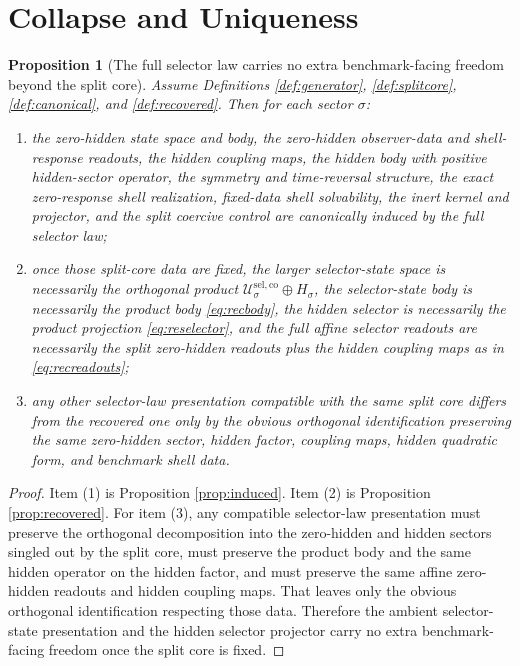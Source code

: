 \documentclass[11pt]{article}
\newcommand{\GapSpace}[1]{H_{#1}}
\newcommand{\SelCoreSpace}[1]{\mathcal U_{#1}^{\mathrm{sel,co}}}
\newtheorem{proposition}{Proposition}
\begin{document}
\section{Collapse and Uniqueness}

\begin{proposition}[The full selector law carries no extra benchmark-facing freedom beyond the split core]
\label{prop:collapse}
Assume Definitions \ref{def:generator}, \ref{def:splitcore}, \ref{def:canonical}, and \ref{def:recovered}. Then for each sector \(\sigma\):
\begin{enumerate}
    \item the zero-hidden state space and body, the zero-hidden observer-data and shell-response readouts, the hidden coupling maps, the hidden body with positive hidden-sector operator, the symmetry and time-reversal structure, the exact zero-response shell realization, fixed-data shell solvability, the inert kernel and projector, and the split coercive control are canonically induced by the full selector law;
    \item once those split-core data are fixed, the larger selector-state space is necessarily the orthogonal product \(\SelCoreSpace{\sigma}\oplus\GapSpace{\sigma}\), the selector-state body is necessarily the product body \eqref{eq:recbody}, the hidden selector is necessarily the product projection \eqref{eq:reselector}, and the full affine selector readouts are necessarily the split zero-hidden readouts plus the hidden coupling maps as in \eqref{eq:recreadouts};
    \item any other selector-law presentation compatible with the same split core differs from the recovered one only by the obvious orthogonal identification preserving the same zero-hidden sector, hidden factor, coupling maps, hidden quadratic form, and benchmark shell data.
\end{enumerate}
\end{proposition}

\begin{proof}
Item (1) is Proposition \ref{prop:induced}. Item (2) is Proposition \ref{prop:recovered}. For item (3), any compatible selector-law presentation must preserve the orthogonal decomposition into the zero-hidden and hidden sectors singled out by the split core, must preserve the product body and the same hidden operator on the hidden factor, and must preserve the same affine zero-hidden readouts and hidden coupling maps. That leaves only the obvious orthogonal identification respecting those data. Therefore the ambient selector-state presentation and the hidden selector projector carry no extra benchmark-facing freedom once the split core is fixed.
\end{proof}
\end{document}
